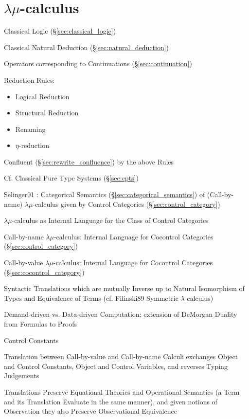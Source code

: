 \section{$\lambda\mu$-calculus}\label{sec:lambda_mu}

Classical Logic (\S\ref{sec:classical_logic})

Classical Natural Deduction (\S\ref{sec:natural_deduction})

Operators corresponding to Continuations (\S\ref{sec:continuation})

Reduction Rules:
\begin{itemize}
  \item Logical Reduction
  \item Structural Reduction
  \item Renaming
  \item $\eta$-reduction
\end{itemize}

Confluent (\S\ref{sec:rewrite_confluence}) by the above Rules

\fist Cf. Classical Pure Type Systems (\S\ref{sec:cpts})


Selinger01 \cite{selinger01}: Categorical Semantics
(\S\ref{sec:categorical_semantics}) of (Call-by-name)
$\lambda\mu$-calculus given by Control Categories
(\S\ref{sec:control_category})

$\lambda\mu$-calculus as Internal Language for the Class of Control
Categories

Call-by-name $\lambda\mu$-calculus: Internal Language for Cocontrol
Categories (\S\ref{sec:control_category})

Call-by-value $\lambda\mu$-calculus: Internal Language for Cocontrol
Categories (\S\ref{sec:cocontrol_category})

Syntactic Translations which are mutually Inverse up to Natural
Isomorphism of Types and Equivalence of Terms (cf. Filinski89
Symmetric $\lambda$-calculus) %

Demand-driven vs. Data-driven Computation; extension of DeMorgan
Duality from Formulas to Proofs %

Control Constants %

Translation between Call-by-value and Call-by-name Calculi exchanges
Object and Control Constants, Object and Control Variables, and
reverses Typing Judgements

Translations Preserve Equational Theories and Operational Semantics (a
Term and its Translation Evaluate in the same manner), and given
notions of Observation they also Preserve Observational Equivalence

